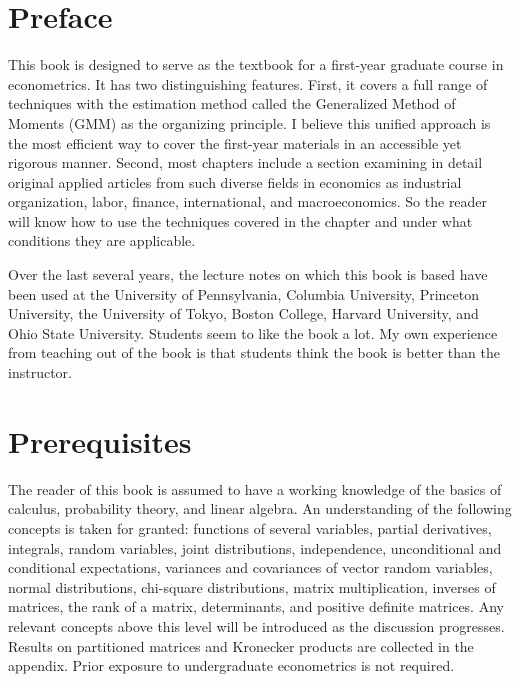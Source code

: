 \documentclass[10pt]{article}
\begin{document}
\section*{Preface}
This book is designed to serve as the textbook for a first-year graduate course in econometrics. It has two distinguishing features. First, it covers a full range of techniques with the estimation method called the Generalized Method of Moments (GMM) as the organizing principle. I believe this unified approach is the most efficient way to cover the first-year materials in an accessible yet rigorous manner. Second, most chapters include a section examining in detail original applied articles from such diverse fields in economics as industrial organization, labor, finance, international, and macroeconomics. So the reader will know how to use the techniques covered in the chapter and under what conditions they are applicable.

Over the last several years, the lecture notes on which this book is based have been used at the University of Pennsylvania, Columbia University, Princeton University, the University of Tokyo, Boston College, Harvard University, and Ohio State University. Students seem to like the book a lot. My own experience from teaching out of the book is that students think the book is better than the instructor.

\section*{Prerequisites}
The reader of this book is assumed to have a working knowledge of the basics of calculus, probability theory, and linear algebra. An understanding of the following concepts is taken for granted: functions of several variables, partial derivatives, integrals, random variables, joint distributions, independence, unconditional and conditional expectations, variances and covariances of vector random variables, normal distributions, chi-square distributions, matrix multiplication, inverses of matrices, the rank of a matrix, determinants, and positive definite matrices. Any relevant concepts above this level will be introduced as the discussion progresses. Results on partitioned matrices and Kronecker products are collected in the appendix. Prior exposure to undergraduate econometrics is not required.
\end{document}
